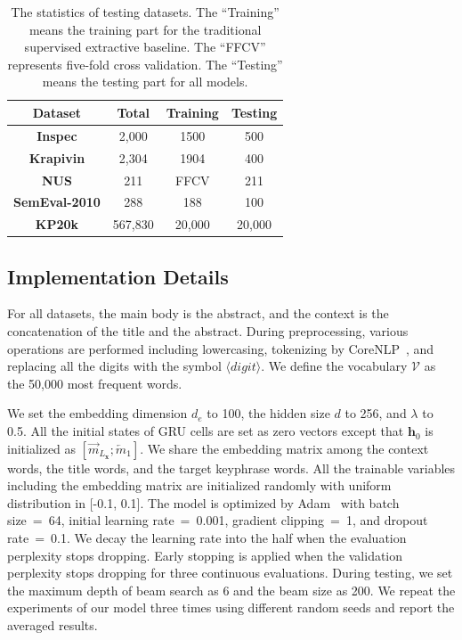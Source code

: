\documentclass[letterpaper]{article} %
\begin{document}
\begin{table}[h]
\centering
\begin{tabular}{ c c c c}
\hline
\hline
 Dataset & Total & Training & Testing\\
\hline
\textbf{Inspec} & 2,000 & 1500 & 500\\
\hline
\textbf{Krapivin} & 2,304 & 1904 & 400\\
\hline
\textbf{NUS} & 211 & FFCV & 211\\
\hline
\textbf{SemEval-2010} & 288 & 188 & 100\\
\hline
\textbf{KP20k} & 567,830 & 20,000 & 20,000\\
\hline
\end{tabular}
\caption{The statistics of testing datasets. The ``Training'' means the training part for the traditional supervised extractive baseline. The ``FFCV'' represents five-fold cross validation. The ``Testing'' means the testing part for all models.}
\label{table:statistic_testset}
\end{table}


\subsection{Implementation Details}
For all datasets, the main body is the abstract, and the context is the concatenation of the title and the abstract. During preprocessing, various operations are performed including lowercasing, tokenizing by CoreNLP~\cite{manning2014stanford}, and replacing all the digits with the symbol $\langle digit \rangle$. We define the vocabulary $\mathcal{V}$ as the 50,000 most frequent words.

We set the embedding dimension $d_e$ to 100, the hidden size $d$ to 256, and $\lambda$ to  0.5. All the initial states of GRU cells are set as zero vectors except that $\mathbf{h}_0$ is initialized as $[\overrightarrow{m}_{L_{\mathbf{x}}}; \overleftarrow{m}_1]$. We share the embedding matrix among the context words, the title words, and the target keyphrase words. All the trainable variables including the embedding matrix are initialized randomly with uniform distribution in [-0.1, 0.1]. The model is optimized by Adam~\cite{kingma2014adam} with batch size~=~64, initial learning rate~=~0.001, gradient clipping~=~1, and dropout rate~=~0.1. We decay the learning rate into the half when the evaluation perplexity stops dropping. Early stopping is applied when the validation perplexity stops dropping for three continuous evaluations. During testing, we set the maximum depth of beam search as 6 and the beam size as 200. We repeat the experiments of our model three times using different random seeds and report the averaged results.
\end{document}

